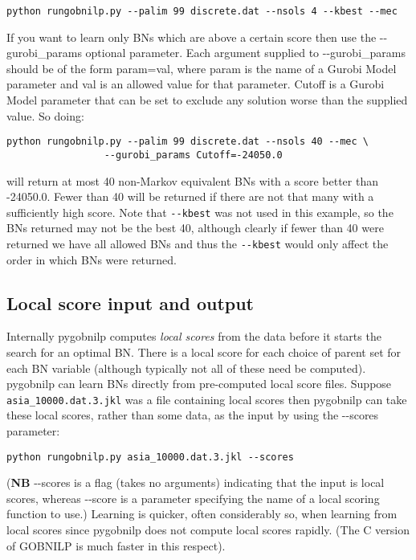 \documentclass{article}
\newcommand{\pygobnilp}{\textsf{pygobnilp}}
\begin{document}
\begin{verbatim}
python rungobnilp.py --palim 99 discrete.dat --nsols 4 --kbest --mec
\end{verbatim}

If you want to learn only BNs which are above a certain score then use
the -{}-gurobi\_params optional parameter. Each argument supplied to 
-{}-gurobi\_params should be of the form param=val, where param is the name of
a Gurobi Model parameter and val is an allowed value for that
parameter. Cutoff is a Gurobi Model parameter that can be set to
exclude any solution worse than the supplied value. So doing:

\begin{verbatim}
python rungobnilp.py --palim 99 discrete.dat --nsols 40 --mec \
                 --gurobi_params Cutoff=-24050.0
\end{verbatim}

will return at most 40 non-Markov equivalent BNs with a score better
than -24050.0. Fewer than 40 will be returned if there are not that
many with a sufficiently high score.  Note that \verb+--kbest+ was not
used in this example, so the BNs returned may not be the best 40,
although clearly if fewer than 40 were returned we have all allowed
BNs and thus the \verb+--kbest+ would only affect the order in which
BNs were returned.

\subsection{Local score input and output}
\label{sec:localscores}

Internally \pygobnilp{} computes \emph{local scores} from the data
before it starts the search for an optimal BN. There is a local score
for each choice of parent set for each BN variable (although typically
not all of these need be computed). \pygobnilp{} can learn BNs
directly from pre-computed local score files. Suppose
\verb+asia_10000.dat.3.jkl+ was a file containing local scores then
\pygobnilp{} can take these local scores, rather than some data, as
the input by using the -{}-scores parameter:
\begin{verbatim}
python rungobnilp.py asia_10000.dat.3.jkl --scores
\end{verbatim}
(\textbf{NB} -{}-scores is a flag (takes no arguments) indicating that
the input is local scores, whereas -{}-score is a parameter specifying
the name of a local scoring function to use.)
Learning is quicker, often considerably so, when learning from local
scores since \pygobnilp{} does not compute local scores rapidly. (The
C version of GOBNILP is much faster in this respect).
\end{document}
